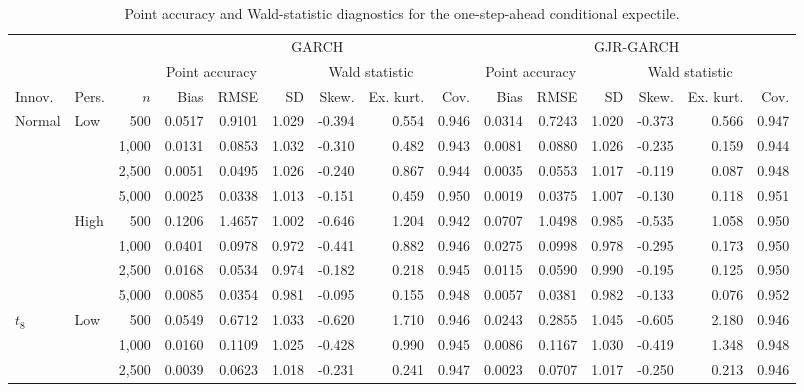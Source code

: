 \begin{table}
\centering
\caption{Point accuracy and Wald-statistic diagnostics for the one-step-ahead conditional expectile.}
\label{tab:mc-ce-wald-diagnostics}
\small
\setlength{\tabcolsep}{2.8pt}
\renewcommand{\arraystretch}{1.03}
\begin{tabular}{llr*{12}{r}}
\toprule
&&&\multicolumn{6}{c}{GARCH}&\multicolumn{6}{c}{GJR-GARCH}\\
\cmidrule(lr){4-9}\cmidrule(lr){10-15}
&&&\multicolumn{2}{c}{Point accuracy}&\multicolumn{4}{c}{Wald statistic}&\multicolumn{2}{c}{Point accuracy}&\multicolumn{4}{c}{Wald statistic}\\
\cmidrule(lr){4-5}\cmidrule(lr){6-9}\cmidrule(lr){10-11}\cmidrule(lr){12-15}
Innov. & Pers. & $n$ & Bias & RMSE & SD & Skew. & Ex. kurt. & Cov. & Bias & RMSE & SD & Skew. & Ex. kurt. & Cov.\\
\midrule
Normal & Low & 500 & 0.0517 & 0.9101 & 1.029 & -0.394 & 0.554 & 0.946 & 0.0314 & 0.7243 & 1.020 & -0.373 & 0.566 & 0.947\\
 &  & 1,000 & 0.0131 & 0.0853 & 1.032 & -0.310 & 0.482 & 0.943 & 0.0081 & 0.0880 & 1.026 & -0.235 & 0.159 & 0.944\\
 &  & 2,500 & 0.0051 & 0.0495 & 1.026 & -0.240 & 0.867 & 0.944 & 0.0035 & 0.0553 & 1.017 & -0.119 & 0.087 & 0.948\\
 &  & 5,000 & 0.0025 & 0.0338 & 1.013 & -0.151 & 0.459 & 0.950 & 0.0019 & 0.0375 & 1.007 & -0.130 & 0.118 & 0.951\\
\addlinespace[1pt]
 & High & 500 & 0.1206 & 1.4657 & 1.002 & -0.646 & 1.204 & 0.942 & 0.0707 & 1.0498 & 0.985 & -0.535 & 1.058 & 0.950\\
 &  & 1,000 & 0.0401 & 0.0978 & 0.972 & -0.441 & 0.882 & 0.946 & 0.0275 & 0.0998 & 0.978 & -0.295 & 0.173 & 0.950\\
 &  & 2,500 & 0.0168 & 0.0534 & 0.974 & -0.182 & 0.218 & 0.945 & 0.0115 & 0.0590 & 0.990 & -0.195 & 0.125 & 0.950\\
 &  & 5,000 & 0.0085 & 0.0354 & 0.981 & -0.095 & 0.155 & 0.948 & 0.0057 & 0.0381 & 0.982 & -0.133 & 0.076 & 0.952\\
\addlinespace[3pt]
$t_8$ & Low & 500 & 0.0549 & 0.6712 & 1.033 & -0.620 & 1.710 & 0.946 & 0.0243 & 0.2855 & 1.045 & -0.605 & 2.180 & 0.946\\
 &  & 1,000 & 0.0160 & 0.1109 & 1.025 & -0.428 & 0.990 & 0.945 & 0.0086 & 0.1167 & 1.030 & -0.419 & 1.348 & 0.948\\
 &  & 2,500 & 0.0039 & 0.0623 & 1.018 & -0.231 & 0.241 & 0.947 & 0.0023 & 0.0707 & 1.017 & -0.250 & 0.213 & 0.946\\

\end{tabular}
\end{table}
